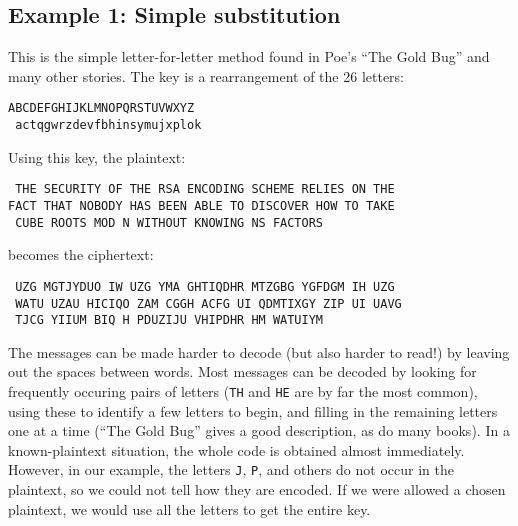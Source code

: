 \subsection*{Example 1: Simple substitution}
This is the simple letter-for-letter method found in Poe's ``The Gold
Bug'' and many other stories.  The key is a rearrangement of the
26 letters:\begin{lst}\tt ABCDEFGHIJKLMNOPQRSTUVWXYZ\\ \tt
actqgwrzdevfbhinsymujxplok\end{lst}
  Using this key, the plaintext:\begin{lst}\tt \label{pl}
  THE SECURITY OF THE RSA ENCODING SCHEME RELIES ON THE\\
\tt FACT THAT NOBODY HAS BEEN ABLE TO DISCOVER HOW TO TAKE \\ \tt
CUBE ROOTS MOD N WITHOUT KNOWING NS FACTORS\end{lst}
becomes the ciphertext:\begin{lst}\tt
  UZG MGTJYDUO IW UZG YMA GHTIQDHR MTZGBG YGFDGM IH UZG\\ \tt
WATU UZAU HICIQO ZAM CGGH ACFG UI QDMTIXGY ZIP UI UAVG \\ \tt
TJCG YIIUM BIQ H PDUZIJU VHIPDHR HM WATUIYM\end{lst}
The messages can be made harder to decode (but also harder to read!)
by leaving out the spaces between words.
\pq Most messages can be decoded by looking for frequently occuring
pairs of letters ({\tt TH} and {\tt HE} are by far the most common),
using these to identify a few letters to begin, and filling in the
remaining letters one at a time (``The Gold Bug'' gives a good
description, as do many books).
\pq In a known-plaintext situation, the whole code is obtained 
almost immediately.  However, in our example, the letters {\tt J},
{\tt P}, and others do not occur in the plaintext, so we could not
tell how they are encoded.  If we were allowed a chosen plaintext,
we would  use all the letters to get the entire key.
